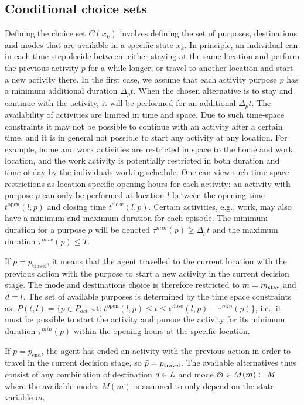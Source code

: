 \subsection{Conditional choice sets}


Defining the choice set $C(x_k)$ involves defining the set of purposes, destinations and modes that are available in a specific state $x_k$.
In principle, an individual can in each time step decide between: either staying at the same location and perform the previous activity $p$ for a while longer; or travel to another location and start a new activity there. In the first case, we assume that each activity purpose $p$ has a minimum additional duration $\Delta_p t$. When the chosen alternative is to stay and continue with the activity, it will be performed for an additional $\Delta_p t$.
The availability of activities are limited in time and space. Due to such time-space constraints it may not be possible to continue with an activity after a certain time, and it is in general not possible to start any activity at any location. For example, home and work activities are restricted in space to the home and work location, and the work activity is potentially restricted in both duration and time-of-day by the individuals working schedule. One can view such time-space restrictions as location specific opening hours for each activity: an activity with purpose $p$ can only be performed at location $l$ between the opening time $t^{\text{open}}({l,p})$ and closing time $t^{\text{close}}({l,p})$. Certain activities, e.g., work, may also have a minimum and maximum duration for each episode. The minimum duration for a purpose $p$ will be denoted $\tau^{min}(p)\geq \Delta_p t$ and the maximum duration $\tau^{max}(p)\leq T$. 

If $p=p_\text{travel}$, it means that the agent travelled to the current location with the previous action with the purpose to start a new activity in the current decision stage. The mode and destinations choice is therefore restricted to $\bar{m} = m_{\text{stay}}$ and $\bar{d}=l$. The set of available purposes is determined by the time space constraints as:
$P(t,l) = \big \{ p \in P_{act} \;\text{s.t:} \; t^{\text{open}}({l,p}) \leq t \leq t^{\text{close}}({l,p}) - \tau^{min}(p) \big \} $, i.e., it must be possible to start the activity and pursue the activity for its minimum duration $\tau^{min}(p)$ within the opening hours at the specific location.



If $p=p_\text{end}$, the agent has ended an activity with the previous action in order to travel in the current decision stage, so $\bar{p}=p_\text{travel}$. The available alternatives thus consist of any combination of destination $\bar{d} \in L$ and mode $\bar{m}\in M(m)\subset M$ where the available modes $M(m)$ is assumed to only depend on the state variable $m$. 


